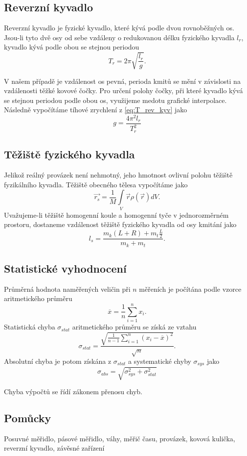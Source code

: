 \documentclass[protokol.tex]{subfiles}
\begin{document}
\subsection*{Reverzní kyvadlo}
Reverzní kyvadlo je fyzické kyvadlo, které kývá podle dvou rovnoběžných os. Jsou-li tyto dvě osy od sebe vzdáleny o redukovanou délku fyzického kyvadla $l_r$, kyvadlo kývá podle obou se stejnou periodou
\begin{equation} \label{eq:T_rev_kyv}
T_r = 2 \pi \sqrt{\frac{l_r}{g}}.
\end{equation}

V našem případě je vzdálenost os pevná, perioda kmitů se mění v závislosti na vzdálenosti těžké kovové čočky. Pro určení polohy čočky, při které kyvadlo kývá se stejnou periodou podle obou os, využijeme medotu grafické interpolace. Následně vypočítáme tíhové zrychlení z \eqref{eq:T_rev_kyv} jako
\begin{equation} \label{eq:g_rev_kyv}
g = \frac{4 \pi^2 l_r}{T_r^2}
\end{equation}

\subsection*{Těžiště fyzického kyvadla}
Jelikož reálný provázek není nehmotný, jeho hmotnost ovlivní polohu těžiště fyzikálního kyvadla. Těžiště obecného tělesa vypočítáme jako
\begin{equation} \label{eq:teziste_obecne}
\vec{r_s} = \frac{1}{M} \int\limits_{V} \vec{r}\rho(\vec{r})dV.
\end{equation}
Uvažujeme-li těžiště homogenní koule a homogenní tyče v jednorozměrném prostoru, dostaneme vzdálenost těžiště fyzického kyvadla od osy kmitání jako
\begin{equation} \label{eq:teziste_kyv}
l_s = \frac{m_k (L + R) + m_t \frac{L}{2}}{m_k + m_t}.
\end{equation}
\subsection*{Statistické vyhodnocení}
Průměrná hodnota naměřených veličin při $n$ měřeních je počítána podle vzorce aritmetického průměru 
$$ \overline{x} = \frac{1}{n} \sum\limits_{i=1}^n{x_i}.$$
Statistická chyba $\sigma_{stat}$ aritmetického průměru se získá ze vztahu
$$ \sigma_{stat} = \frac{\sqrt{\frac{1}{n-1} \sum\limits_{i=1}^n{(x_i - \overline{x})^2}}}{\sqrt{n}}. $$
Absolutní chyba je potom získána z $\sigma_{stat}$ a systematické chyby $\sigma_{sys}$ jako
$$ \sigma_{abs} = \sqrt{\sigma_{sys}^2 + \sigma_{stat}^2}$$

Chyba výpočtů se řídí zákonem přenosu chyb.

\subsection*{Pomůcky}
Posuvné měřidlo, pásové měřidlo, váhy, měřič času, provázek, kovová kulička, reverzní kyvadlo, závěsné zařízení
\end{document}
